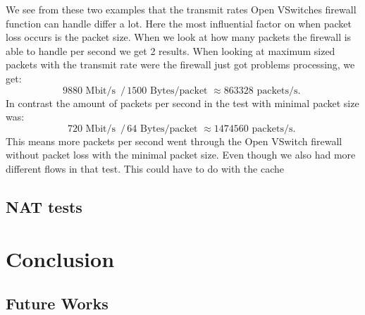 \documentclass[11pt,a4paper,twoside,openright,bachelor,english]{netthesis}
\begin{document}
We see from these two examples that the transmit rates Open VSwitches firewall function can handle differ a lot. Here the most influential factor on when packet loss occurs is the packet size. When we look at how many packets the firewall is able to handle per second we get 2 results. When looking at maximum sized packets with the transmit rate were the firewall just got problems processing, we get: $$ 9880  \text{ Mbit/s } \, / \, 1500 \text{ Bytes/packet }  \approx 863328 \text{ packets/s. } $$
In contrast the amount of packets per second in the test with minimal packet size was: $$ 720  \text{ Mbit/s } \, / \, 64 \text{ Bytes/packet }  \approx 1474560 \text{ packets/s. }$$
This means more packets per second went through the Open VSwitch firewall without packet loss with the minimal packet size. Even though we also had more different flows in that test. This could have to do with the cache 

\section{NAT tests}

\chapter{Conclusion}

\section{Future Works}


%
\appendix
%

%





\end{document}
